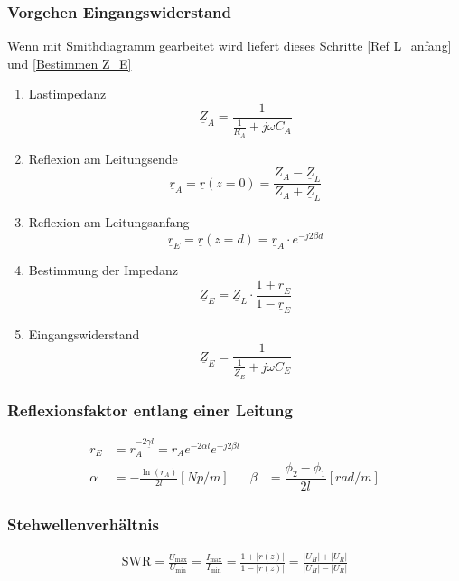 \subsubsection{Vorgehen Eingangswiderstand}
Wenn mit Smithdiagramm gearbeitet wird liefert dieses Schritte \ref{Ref L_anfang} und \ref{Bestimmen Z_E}
\begin{enumerate}
    \item Lastimpedanz
          \[ \underline{Z}_A = \dfrac{1}{\frac{1}{R_A} + j \omega C_A} \]
    \item Reflexion am Leitungsende
          \[ \underline{r}_A = \underline{r}(z=0) = \dfrac{Z_A - \underline{Z}_L}{Z_A + \underline{Z}_L} \]
    \item Reflexion am Leitungsanfang \label{Ref L_anfang}
          \[ \underline{r}_E = \underline{r}(z=d) =  \underline{r}_A \cdot e^{-j 2 \beta d}\]
    \item Bestimmung der Impedanz \label{Bestimmen Z_E}
          \[ \underline{Z}_E = \underline{Z}_L \cdot \dfrac{1 + \underline{r}_E}{1 - \underline{r}_E}\]
    \item Eingangswiderstand
          \[ \underline{Z}_E = \dfrac{1}{\frac{1}{\underline{Z}_E} + j \omega C_E}\]
\end{enumerate}


\subsubsection{Reflexionsfaktor entlang einer Leitung}
\begin{align*}
    r_E    & = r_A  ^{-2\underline{\gamma} l} = r_A  e^{-2\alpha l} e^{-j2\beta l}                                                     \\
    \alpha & = -\frac{\ln(r_A)}{2l} [\si{Np/m}]                                    & \beta & = \dfrac{\phi_2 -\phi_1}{2l} [\si{rad/m}]
\end{align*}

\subsubsection{Stehwellenverhältnis}
\begin{align*}
    \mathrm{SWR} = \frac{U_\text{max}}{U_\text{min}} =
    \frac{I_\text{max}}{I_\text{min}} = \frac{1+|r(z)|}{1-|r(z)|} =
    \frac{|U_H|+|U_R|}{|U_H|-|U_R|}
\end{align*}

